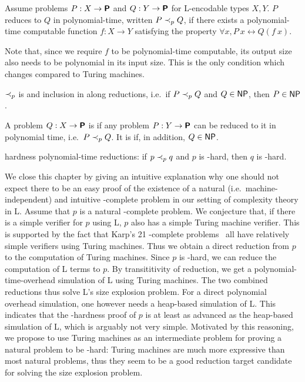 \begin{definition}
  Assume problems $P : X \rightarrow \textsf{\bfseries P}$ and $Q : Y \rightarrow \textsf{\bfseries P}$ for L-encodable types $X, Y$. $P$ reduces to $Q$ in polynomial-time, written $P \prec_p{} Q$, if there exists a polynomial-time computable function $f : X \rightarrow Y$ satisfying the property $\forall x, P~x \leftrightarrow Q(f~x)$. 
\end{definition}
Note that, since we require $f$ to be polynomial-time computable, its output size also needs to be polynomial in its input size. This is the only condition which changes compared to Turing machines.

$\prec_p$ is  and inclusion in \NP{}  along reductions, i.e.\ if $P \prec_p{} Q$ and $Q \in \normalfont\textsf{NP}{}$, then $P \in \textsf{NP}{}$.

\begin{definition}
  A problem $Q : X \rightarrow \textsf{\bfseries P}$ is  if any problem $P : Y \rightarrow \textsf{\bfseries P}$ can be reduced to it in polynomial time, i.e.\ $P \prec_p{} Q$. It is  if, in addition, $Q \in \normalfont\textsf{NP}{}$.
\end{definition}

\NP{} hardness  polynomial-time reductions: if $p \prec_p{} q$ and $p$ is \NP{}-hard, then $q$ is \NP{}-hard.

\begin{remark}\label{rem:cook_L}
We close this chapter by giving an intuitive explanation why one should not expect there to be an easy proof of the existence of a natural (i.e.\ machine-independent) and intuitive \NP{}-complete problem in our setting of complexity theory in L.
Assume that $p$ is a natural \NP{}-complete problem. We conjecture that, if there is a simple verifier for $p$ using L, $p$ also has a simple Turing machine verifier. This is supported by the fact that Karp's 21 \NP{}-complete problems~\cite{Karp1972} all have relatively simple verifiers using Turing machines.
Thus we obtain a direct reduction from $p$ to the computation of Turing machines. 
Since $p$ is \NP{}-hard, we can reduce the computation of L terms to $p$. By transititivity of reduction, we get a polynomial-time-overhead simulation of L using Turing machines. The two combined reductions thus solve L's size explosion problem. 
For a direct polynomial overhead simulation, one however needs a heap-based simulation of L.
This indicates that the \NP{}-hardness proof of $p$ is at least as advanced as the heap-based simulation of L, which is arguably not very simple.
Motivated by this reasoning, we propose to use Turing machines as an intermediate problem for proving a natural problem to be \NP{}-hard: Turing machines are much more expressive than most natural problems, thus they seem to be a good reduction target candidate for solving the size explosion problem.
\end{remark}

